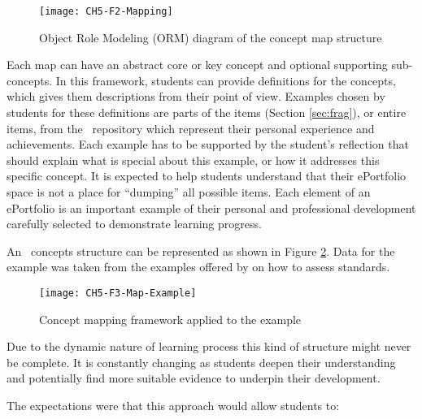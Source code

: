\begin{figure}[htb]
\centering
\texttt{[image: CH5-F2-Mapping]}
\caption{Object Role Modeling (ORM) diagram of the concept map structure}
\label{fig:mapping} 
\end{figure}

Each map can have an abstract core or key concept and optional supporting
sub-concepts. In this framework, students can provide definitions for the
concepts, which gives them descriptions from their point of view. Examples
chosen by students for these definitions are parts of the items (Section
\ref{sec:frag}), or entire items, from the \ep~repository which represent their
personal experience and achievements. Each example has to be supported by the
student's reflection that should explain what is special about this example, or
how it addresses this specific concept. It is expected to help students
understand that their ePortfolio space is not a place for ``dumping'' all
possible items. Each element of an ePortfolio is an important example of their
personal and professional development carefully selected to demonstrate learning
progress.

An \ep~concepts structure can be represented as shown in Figure \ref{fig:mapex}.
Data for the example was taken from the examples offered by \citet{Marzano1993}
on how to assess \LLLs standards.
 
\begin{figure}[htb]
\centering
\texttt{[image: CH5-F3-Map-Example]}
\caption{Concept mapping framework applied to the example}
\label{fig:mapex} 
\end{figure}

Due to the dynamic nature of learning process this kind of structure might never
be complete. It is constantly changing as students deepen their understanding
and potentially find more suitable evidence to underpin their development.

The expectations were that this approach would allow students to:

